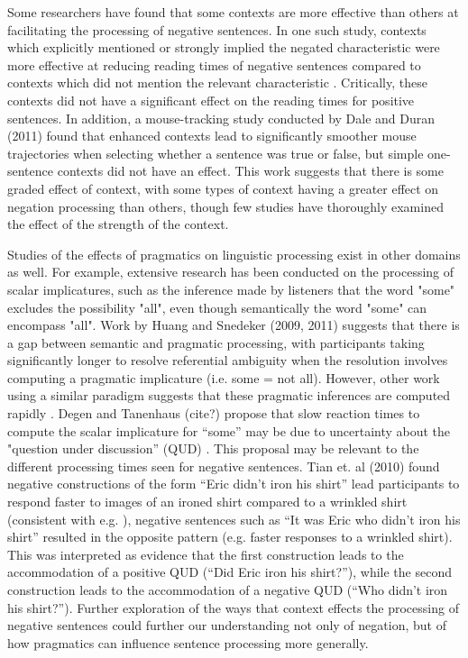 \documentclass[10pt,letterpaper]{article}
\begin{document}
Some researchers have found that some contexts are more effective than others at facilitating the processing of negative sentences.  In one such study, contexts which explicitly mentioned or strongly implied the negated characteristic were more effective at reducing reading times of negative sentences compared to contexts which did not mention the relevant characteristic \cite{ludtke2006}.  Critically, these contexts did not have a significant effect on the reading times for positive sentences.  In addition, a mouse-tracking study conducted by Dale and Duran (2011) \nocite{dale2011} found that enhanced contexts lead to significantly smoother mouse trajectories when selecting whether a sentence was true or false, but simple one-sentence contexts did not have an effect.  This work suggests that there is some graded effect of context, with some types of context having a greater effect on negation processing than others, though few studies have thoroughly examined the effect of the strength of the context.

Studies of the effects of pragmatics on linguistic processing exist in other domains as well.  For example, extensive research has been conducted on the processing of scalar implicatures, such as the inference made by listeners that the word "some" excludes the possibility "all", even though semantically the word "some" can encompass "all".  Work by Huang and Snedeker (2009, 2011) \nocite{huang2009, huang2011} suggests that there is a gap between semantic and pragmatic processing, with participants taking significantly longer to resolve referential ambiguity when the resolution involves computing a pragmatic implicature (i.e. some = not all).  However, other work using a similar paradigm suggests that these pragmatic inferences are computed rapidly \cite{grodner2010}.  Degen and Tanenhaus (cite?) propose that slow reaction times to compute the scalar implicature for ``some'' may be due to uncertainty about the "question under discussion'' (QUD) \cite{roberts1996}.  This proposal may be relevant to the different processing times seen for negative sentences.  Tian et. al (2010) \nocite{tian2010} found negative constructions of the form ``Eric didn't iron his shirt'' lead participants to respond faster to images of an ironed shirt compared to a wrinkled shirt (consistent with e.g. ), negative sentences such as ``It was Eric who didn't iron his shirt'' resulted in the opposite pattern (e.g. faster responses to a wrinkled shirt).  This was interpreted as evidence that the first construction leads to the accommodation of a positive QUD (``Did Eric iron his shirt?''), while the second construction leads to the accommodation of a negative QUD (``Who didn't iron his shirt?'').  Further exploration of the ways that context effects the processing of negative sentences could further our understanding not only of negation, but of how pragmatics can influence sentence processing more generally.  
\end{document}
